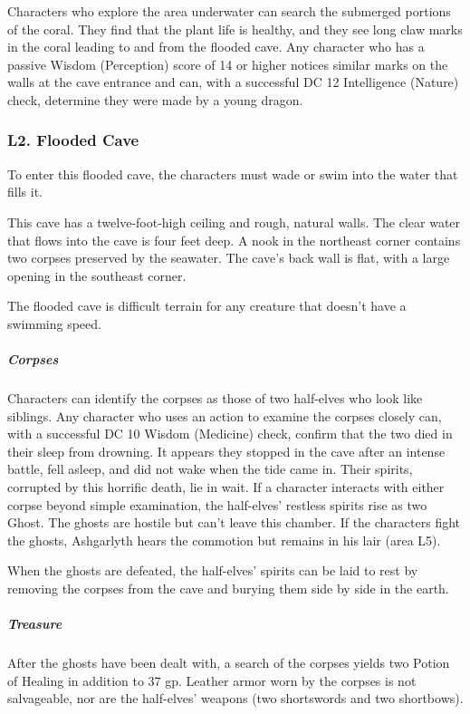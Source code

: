 \documentclass[10pt,a4paper,twoside,bg=print,twocolumn,openany,nodeprecatedcode]{dndbook}
\begin{document}
Characters who explore the area underwater can search the submerged portions of the coral. They find that the plant life is healthy, and they see long claw marks in the coral leading to and from the flooded cave. Any character who has a passive Wisdom (Perception) score of 14 or higher notices similar marks on the walls at the cave entrance and can, with a successful DC 12 Intelligence (Nature) check, determine they were made by a young dragon.

\subsubsection{L2. Flooded Cave}
To enter this flooded cave, the characters must wade or swim into the water that fills it.

\begin{DndReadAloud}{}
This cave has a twelve-foot-high ceiling and rough, natural walls. The clear water that flows into the cave is four feet deep. A nook in the northeast corner contains two corpses preserved by the seawater. The cave's back wall is flat, with a large opening in the southeast corner.

\end{DndReadAloud}

The flooded cave is difficult terrain for any creature that doesn't have a swimming speed.

\subparagraph{Corpses}
Characters can identify the corpses as those of two half-elves who look like siblings. Any character who uses an action to examine the corpses closely can, with a successful DC 10 Wisdom (Medicine) check, confirm that the two died in their sleep from drowning. It appears they stopped in the cave after an intense battle, fell asleep, and did not wake when the tide came in. Their spirits, corrupted by this horrific death, lie in wait. If a character interacts with either corpse beyond simple examination, the half-elves' restless spirits rise as two Ghost. The ghosts are hostile but can't leave this chamber. If the characters fight the ghosts, Ashgarlyth hears the commotion but remains in his lair (area L5).

When the ghosts are defeated, the half-elves' spirits can be laid to rest by removing the corpses from the cave and burying them side by side in the earth.

\subparagraph{Treasure}
After the ghosts have been dealt with, a search of the corpses yields two Potion of Healing in addition to 37 gp. Leather armor worn by the corpses is not salvageable, nor are the half-elves' weapons (two shortswords and two shortbows).
\end{document}
